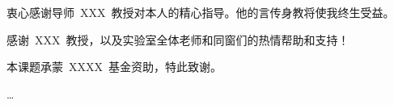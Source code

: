 \begin{acknowledgements}
衷心感谢导师~XXX~教授对本人的精心指导。他的言传身教将使我终生受益。

感谢~XXX~教授，以及实验室全体老师和同窗们的热情帮助和支持！

本课题承蒙~XXXX~基金资助，特此致谢。
\end{acknowledgements}

…
